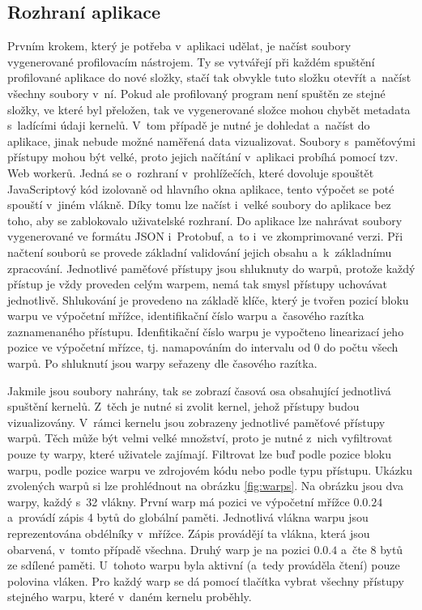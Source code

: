 \subsection{Rozhraní aplikace}
Prvním krokem, který je potřeba v~aplikaci udělat, je načíst soubory vygenerované profilovacím nástrojem. Ty se vytvářejí při každém spuštění profilované aplikace do nové složky, stačí tak obvykle tuto složku otevřít a~načíst všechny soubory v~ní. Pokud ale profilovaný program není spuštěn ze stejné složky, ve které byl přeložen, tak ve vygenerované složce mohou chybět metadata s~ladícími údaji kernelů. V~tom případě je nutné je dohledat a~načíst do aplikace, jinak nebude možné naměřená data vizualizovat. Soubory s~paměťovými přístupy mohou být velké, proto jejich načítání v~aplikaci probíhá pomocí tzv. Web workerů. Jedná se o~rozhraní v~prohlížečích, které dovoluje spouštět JavaScriptový kód izolovaně od hlavního okna aplikace, tento výpočet se poté spouští v~jiném vlákně. Díky tomu lze načíst i~velké soubory do aplikace bez toho, aby se zablokovalo uživatelské rozhraní. Do aplikace lze nahrávat soubory vygenerované ve formátu JSON i~Protobuf, a~to i~ve zkomprimované verzi. Při načtení souborů se provede základní validování jejich obsahu a~k~základnímu zpracování. Jednotlivé paměťové přístupy jsou shluknuty do warpů, protože každý přístup je vždy proveden celým warpem, nemá tak smysl přístupy uchovávat jednotlivě. Shlukování je provedeno na základě klíče, který je tvořen pozicí bloku warpu ve výpočetní mřížce, identifikační číslo warpu a~časového razítka zaznamenaného přístupu. Idenfitikační číslo warpu je vypočteno linearizací jeho pozice ve výpočetní mřízce, tj. namapováním do intervalu od 0 do počtu všech warpů. Po shluknutí jsou warpy seřazeny dle časového razítka. 

Jakmile jsou soubory nahrány, tak se zobrazí časová osa obsahující jednotlivá spuštění kernelů. Z~těch je nutné si zvolit kernel, jehož přístupy budou vizualizovány. V~rámci kernelu jsou zobrazeny jednotlivé paměťové přístupy warpů. Těch může být velmi velké množství, proto je nutné z~nich vyfiltrovat pouze ty warpy, které uživatele zajímají. Filtrovat lze buď podle pozice bloku warpu, podle pozice warpu ve zdrojovém kódu nebo podle typu přístupu. Ukázku zvolených warpů si lze prohlédnout na obrázku \ref{fig:warps}.
Na obrázku jsou dva warpy, každý s~32 vlákny. První warp má pozici ve výpočetní mřížce $0.0.24$ a~provádí zápis 4 bytů do globální paměti. Jednotlivá vlákna warpu jsou reprezentována obdélníky v~mřížce. Zápis provádějí ta vlákna, která jsou obarvená, v~tomto případě všechna. Druhý warp je na pozici $0.0.4$ a~čte 8 bytů ze sdílené paměti. U~tohoto warpu byla aktivní (a~tedy prováděla čtení) pouze polovina vláken. Pro každý warp se dá pomocí tlačítka vybrat všechny přístupy stejného warpu, které v~daném kernelu proběhly.

